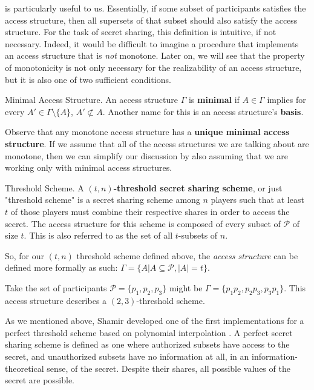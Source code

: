  is particularly useful to us. Essentially, if some subset of participants satisfies the access structure, then all supersets of that subset should also satisfy the access structure. For the task of secret sharing, this definition is intuitive, if not necessary. Indeed, it would be difficult to imagine a procedure that implements an access structure that is \textit{not} monotone. Later on, we will see that the property of monotonicity is not only necessary for the realizability of an access structure, but it is also one of two sufficient conditions.

\theoremstyle{definition}
\begin{definition}{Minimal Access Structure.}
    \label{defn:minimal}
    An access structure $\Gamma$ is \textbf{minimal} if $A \in \Gamma$ implies for every $A' \in \Gamma \setminus \{A\}$, $A' \not\subset A$. Another name for this is an access structure's \textbf{basis}.
\end{definition}

Observe that any monotone access structure has a \textbf{unique minimal access structure}. If we assume that all of the access structures we are talking about are monotone, then we can simplify our discussion by also assuming that we are working only with minimal access structures.

\theoremstyle{definition}
\begin{definition}{Threshold Scheme.}
    \label{defn:threshold-scheme}
    A \textbf{$(t,n)$-threshold secret sharing scheme}, or just "threshold scheme" is a secret sharing scheme among $n$ players such that at least $t$ of those players must combine their respective shares in order to access the secret. The access structure for this scheme is composed of every subset of $\mathcal{P}$ of size $t$. This is also referred to as the set of all $t$-subsets of $n$.
\end{definition}

So, for our $(t,n)$ threshold scheme defined above, the \textit{access structure} can be defined more formally as such: $\Gamma = \{A | A \subseteq \mathcal{P} , |A| = t\}$.

\begin{example}
    Take the set of participants $\mathcal{P} = \{p_1,p_2,p_3\}$ might be $\Gamma = \{p_1p_2,p_2p_3,p_3p_1\}$. This access structure describes a $(2,3)$-threshold scheme.
\end{example}

As we mentioned above, Shamir developed one of the first implementations for a perfect threshold scheme based on polynomial interpolation \cite{shamir}. A perfect secret sharing scheme is defined as one where authorized subsets have access to the secret, and unauthorized subsets have no information at all, in an information-theoretical sense, of the secret. Despite their shares, all possible values of the secret are possible.

